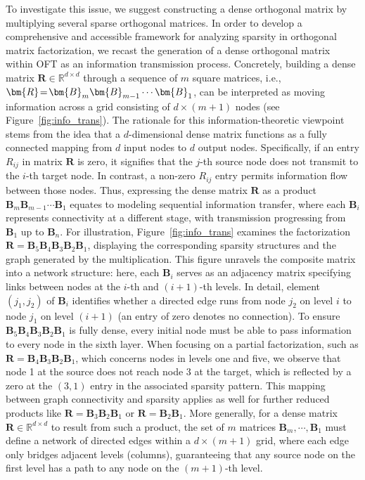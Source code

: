 To investigate this issue, we suggest constructing a dense orthogonal matrix by multiplying several sparse orthogonal matrices. In order to develop a comprehensive and accessible framework for analyzing sparsity in orthogonal matrix factorization, we recast the generation of a dense orthogonal matrix within OFT as an information transmission process. Concretely, building a dense matrix $\bm{R}\in\mathbb{R}^{d\times d}$ through a sequence of $m$ square matrices, i.e., $\thickmuskip=2mu \medmuskip=2mu \bm{R}=\bm{B}_m\bm{B}_{m-1}\cdots\bm{B}_1$, can be interpreted as moving information across a grid consisting of $d\times(m+1)$ nodes (see Figure~\ref{fig:info_trans}). The rationale for this information-theoretic viewpoint stems from the idea that a $d$-dimensional dense matrix functions as a fully connected mapping from $d$ input nodes to $d$ output nodes. Specifically, if an entry $R_{ij}$ in matrix $\bm{R}$ is zero, it signifies that the $j$-th source node does not transmit to the $i$-th target node. In contrast, a non-zero $R_{ij}$ entry permits information flow between those nodes. Thus, expressing the dense matrix $\bm{R}$ as a product $\bm{B}_m\bm{B}_{m-1}\cdots\bm{B}_1$ equates to modeling sequential information transfer, where each $\bm{B}_i$ represents connectivity at a different stage, with transmission progressing from $\bm{B}_1$ up to $\bm{B}_n$. For illustration, Figure~\ref{fig:info_trans} examines the factorization $\bm{R}=\bm{B}_5\bm{B}_4\bm{B}_3\bm{B}_2\bm{B}_1$, displaying the corresponding sparsity structures and the graph generated by the multiplication. This figure unravels the composite matrix into a network structure: here, each $\bm{B}_i$ serves as an adjacency matrix specifying links between nodes at the $i$-th and $(i+1)$-th levels. In detail, element $(j_1, j_2)$ of $\bm{B}_i$ identifies whether a directed edge runs from node $j_2$ on level $i$ to node $j_1$ on level $(i+1)$ (an entry of zero denotes no connection). To ensure $\bm{B}_5\bm{B}_4\bm{B}_3\bm{B}_2\bm{B}_1$ is fully dense, every initial node must be able to pass information to every node in the sixth layer. When focusing on a partial factorization, such as $\bm{R}=\bm{B}_4\bm{B}_3\bm{B}_2\bm{B}_1$, which concerns nodes in levels one and five, we observe that node 1 at the source does not reach node 3 at the target, which is reflected by a zero at the $(3,1)$ entry in the associated sparsity pattern. This mapping between graph connectivity and sparsity applies as well for further reduced products like $\bm{R}=\bm{B}_3\bm{B}_2\bm{B}_1$ or $\bm{R}=\bm{B}_2\bm{B}_1$. More generally, for a dense matrix $\bm{R}\in\mathbb{R}^{d\times d}$ to result from such a product, the set of $m$ matrices $\bm{B}_m,\cdots,\bm{B}_1$ must define a network of directed edges within a $d\times (m+1)$ grid, where each edge only bridges adjacent levels (columns), guaranteeing that any source node on the first level has a path to any node on the $(m+1)$-th level.

